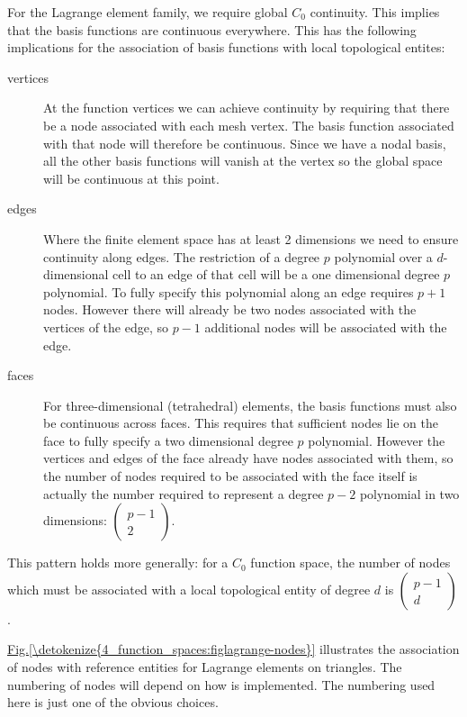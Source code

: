 \documentclass{book}
\begin{document}
For the Lagrange element family, we require global \(C_0\)
continuity. This implies that the basis functions are continuous
everywhere. This has the following implications for the association of
basis functions with local topological entites:
\begin{description}
\item[{vertices}] \leavevmode
At the function vertices we can achieve continuity by requiring
that there be a node associated with each mesh vertex. The basis
function associated with that node will therefore be continuous. Since
we have a nodal basis, all the other basis functions will vanish at
the vertex so the global space will be continuous at this point.

\item[{edges}] \leavevmode
Where the finite element space has at least 2 dimensions we need to
ensure continuity along edges. The restriction of a degree \(p\)
polynomial over a \(d\)-dimensional cell to an edge of that cell will
be a one dimensional degree \(p\) polynomial. To fully specify this
polynomial along an edge requires \(p+1\) nodes. However there will
already be two nodes associated with the vertices of the edge, so
\(p-1\) additional nodes will be associated with the edge.

\item[{faces}] \leavevmode
For three-dimensional (tetrahedral) elements, the basis
functions must also be continuous across faces. This requires that
sufficient nodes lie on the face to fully specify a two dimensional
degree \(p\) polynomial. However the vertices and edges of the face
already have nodes associated with them, so the number of nodes
required to be associated with the face itself is actually the
number required to represent a degree \(p-2\) polynomial in two
dimensions: \(\begin{pmatrix}p-1\\ 2\end{pmatrix}\).

\end{description}

This pattern holds more generally: for a \(C_0\) function space, the
number of nodes which must be associated with a local topological
entity of degree \(d\) is \(\begin{pmatrix}p-1\\ d\end{pmatrix}\).

\hyperref[\detokenize{4_function_spaces:figlagrange-nodes}]{Fig.\@ \ref{\detokenize{4_function_spaces:figlagrange-nodes}}} illustrates the association of nodes with
reference entities for Lagrange elements on triangles. The numbering
of nodes will depend on how
 is implemented. The
numbering used here is just one of the obvious choices.
\end{document}
